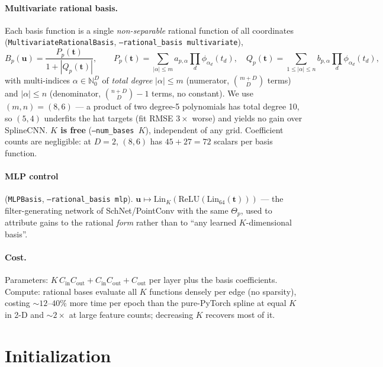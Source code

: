 \documentclass[11pt]{article}
\newcommand{\bu}{\mathbf{u}}
\newcommand{\bt}{\mathbf{t}}
\newcommand{\Cin}{C_{\mathrm{in}}}
\newcommand{\Cout}{C_{\mathrm{out}}}
\newcommand{\code}[1]{\texttt{#1}}
\begin{document}
\paragraph{Multivariate rational basis.} Each basis function is a single
\emph{non-separable} rational function of all coordinates
(\code{MultivariateRationalBasis}, \code{--rational\_basis multivariate}),
\begin{equation}
B_p(\bu) = \frac{P_p(\bt)}{1+|Q_p(\bt)|},\qquad
P_p(\bt)=\!\!\sum_{|\alpha|\le m}\! a_{p,\alpha}\prod_d \phi_{\alpha_d}(t_d),\quad
Q_p(\bt)=\!\!\sum_{1\le|\alpha|\le n}\! b_{p,\alpha}\prod_d \phi_{\alpha_d}(t_d),
\label{eq:multivariate}
\end{equation}
with multi-indices $\alpha\in\mathbb N_0^D$ of \emph{total degree}
$|\alpha|\le m$ (numerator, $\binom{m+D}{D}$ terms) and $|\alpha|\le n$
(denominator, $\binom{n+D}{D}{-}1$ terms, no constant). We use $(m,n)=(8,6)$
--- a product of two degree-5 polynomials has total degree 10, so $(5,4)$
underfits the hat targets (fit RMSE $3\times$ worse) and yields no gain over
SplineCNN. \textbf{$K$ is free} (\code{--num\_bases $K$}), independent of any
grid. Coefficient counts are negligible: at $D{=}2$, $(8,6)$ has $45{+}27=72$
scalars per basis function.

\paragraph{MLP control} (\code{MLPBasis}, \code{--rational\_basis mlp}).
$\bu \mapsto \mathrm{Lin}_K(\mathrm{ReLU}(\mathrm{Lin}_{64}(\bt)))$ --- the
filter-generating network of SchNet/PointConv with the same $\Theta_p$, used
to attribute gains to the rational \emph{form} rather than to ``any learned
$K$-dimensional basis''.

\paragraph{Cost.} Parameters: $K\,\Cin\Cout + \Cin\Cout + \Cout$ per layer
plus the basis coefficients. Compute: rational bases evaluate all $K$
functions densely per edge (no sparsity), costing ${\sim}12$--$40\%$ more
time per epoch than the pure-PyTorch spline at equal $K$ in 2-D and
${\sim}2\times$ at large feature counts; decreasing $K$ recovers most of it.

\section{Initialization}
\label{sec:init}
\end{document}
